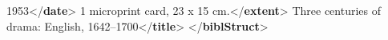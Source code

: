 \begin{shaded}
\hspace*{1em}\hspace*{1em}1953{</\textbf{date}>}\mbox{}\newline 
\hspace*{1em}\mbox{}\newline 
\hspace*{1em}1 microprint card, 23 x 15 cm.{</\textbf{extent}>}\mbox{}\newline 
{}\mbox{}\newline 
{}\mbox{}\newline 
\hspace*{1em}Three centuries of drama: English, 1642–1700{</\textbf{title}>}\mbox{}\newline 
{}\mbox{}\newline 
{</\textbf{biblStruct}>}\end{shaded}\egroup\par \noindent  \par
